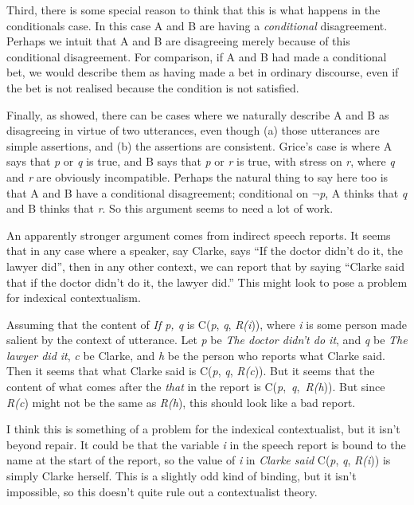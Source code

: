 Third, there is some special reason to think that this is what happens in the conditionals case. In this case A and B are having a \textit{conditional} disagreement. Perhaps we intuit that A and B are disagreeing merely because of this conditional disagreement. For comparison, if A and B had made a conditional bet, we would describe them as having made a bet in ordinary discourse, even if the bet is not realised because the condition is not satisfied.

Finally, as \citet{Grice1989} showed, there can be cases where we naturally describe A and B as disagreeing in virtue of two utterances, even though (a) those utterances are simple assertions, and (b) the assertions are consistent. Grice's case is where A says that \textit{p} or \textit{q} is true, and B says that \textit{p} or \textit{r} is true, with stress on \textit{r}, where \textit{q} and \textit{r} are obviously incompatible. Perhaps the natural thing to say here too is that A and B have a conditional disagreement; conditional on \(\neg\){}\textit{p}, A thinks that \textit{q} and B thinks that \textit{r}. So this argument seems to need a lot of work.

An apparently stronger argument comes from indirect speech reports. It seems that in any case where a speaker, say Clarke, says ``If the doctor didn't do it, the lawyer did'', then in any other context, we can report that by saying ``Clarke said that if the doctor didn't do it, the lawyer did.'' This might look to pose a problem for indexical contextualism.

Assuming that the content of \textit{If p, q} is C(\textit{p}, \textit{q}, \textit{R(i})), where \textit{i} is some person made salient by the context of utterance. Let \textit{p} be \textit{The doctor didn't do it}, and \textit{q} be \textit{The lawyer did it}, \textit{c} be Clarke, and \textit{h} be the person who reports what Clarke said. Then it seems that what Clarke said is C(\textit{p}, \textit{q}, \textit{R(c})). But it seems that the content of what comes after the \textit{that} in the report is C(\textit{p},~\textit{q},~\textit{R(h})). But since \textit{R(c}) might not be the same as \textit{R(h}), this should look like a bad report.

I think this is something of a problem for the indexical contextualist, but it isn't beyond repair. It could be that the variable \textit{i} in the speech report is bound to the name at the start of the report, so the value of \textit{i} in \textit{Clarke said }C(\textit{p}, \textit{q}, \textit{R(i})) is simply Clarke herself. This is a slightly odd kind of binding, but it isn't impossible, so this doesn't quite rule out a contextualist theory.

